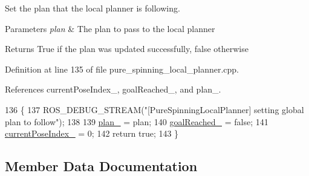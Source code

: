 Set the plan that the local planner is following. 


\begin{DoxyParams}{Parameters}
{\em plan} & The plan to pass to the local planner \\
\hline
\end{DoxyParams}
\begin{DoxyReturn}{Returns}
True if the plan was updated successfully, false otherwise 
\end{DoxyReturn}


Definition at line 135 of file pure\+\_\+spinning\+\_\+local\+\_\+planner.\+cpp.



References current\+Pose\+Index\+\_\+, goal\+Reached\+\_\+, and plan\+\_\+.


\begin{DoxyCode}
136 \{
137   ROS\_DEBUG\_STREAM(\textcolor{stringliteral}{"[PureSpinningLocalPlanner] setting global plan to follow"});
138 
139   \hyperlink{classcl__move__base__z_1_1pure__spinning__local__planner_1_1PureSpinningLocalPlanner_a31875ee78bae4698b579e20c0754860d}{plan\_} = plan;
140   \hyperlink{classcl__move__base__z_1_1pure__spinning__local__planner_1_1PureSpinningLocalPlanner_aecfe0dfc68b8c8e461e8b684e5fa4d2f}{goalReached\_} = \textcolor{keyword}{false};
141   \hyperlink{classcl__move__base__z_1_1pure__spinning__local__planner_1_1PureSpinningLocalPlanner_aa0f9b4cf52a76e44dc2cfc5103d52dcd}{currentPoseIndex\_} = 0;
142   \textcolor{keywordflow}{return} \textcolor{keyword}{true};
143 \}
\end{DoxyCode}


\subsection{Member Data Documentation}
\mbox{\label{classcl__move__base__z_1_1pure__spinning__local__planner_1_1PureSpinningLocalPlanner_a63f75481071df118d56e8b652e68b002}} 
